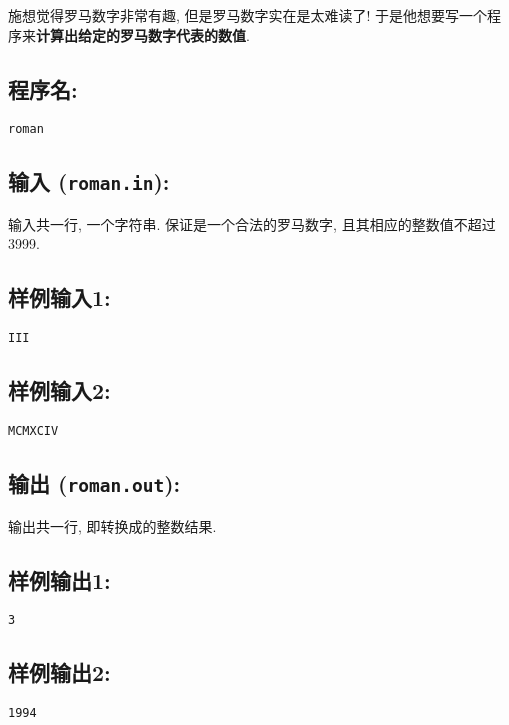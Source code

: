 \documentclass{article}
\begin{document}
施想觉得罗马数字非常有趣, 但是罗马数字实在是太难读了!
于是他想要写一个程序来\textbf{计算出给定的罗马数字代表的数值}.

\subsection*{程序名:}

\texttt{roman}

\subsection*{输入 (\texttt{roman.in}):}

输入共一行, 一个字符串. 保证是一个合法的罗马数字, 且其相应的整数值不超过3999.

\subsection*{样例输入1:}

\begin{verbatim}
III
\end{verbatim}

\subsection*{样例输入2:}

\begin{verbatim}
MCMXCIV
\end{verbatim}

\subsection*{输出 (\texttt{roman.out}):}

输出共一行, 即转换成的整数结果.

\subsection*{样例输出1:}

\begin{verbatim}
3
\end{verbatim}

\subsection*{样例输出2:}

\begin{verbatim}
1994
\end{verbatim}
\end{document}
